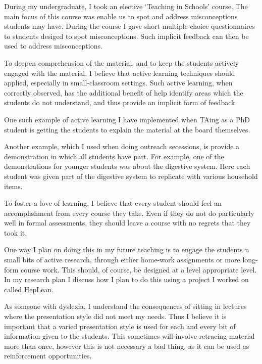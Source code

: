 \documentclass[12pt,letter]{article}
\newcounter{customtitle}
\begin{document}
 During my undergraduate, I took an elective `Teaching in Schools' course. The main focus of this course was enable us to spot and address misconceptions students may have.  During the course I gave short multiple-choice questionnaires to students desiged to spot misconceptions. Such implicit feedback can then be used to address misconceptions.
 
 To deepen comprehension of the material, and to keep the students actively   engaged with the material, I believe that active learning techniques should applied, especially in small-classroom
settings. Such active learning, when correctly observed, has the additional benefit of help identify areas which the students 
do not understand, and thus provide an implicit form of feedback.

One such example of active learning I have implemented when TAing as a PhD student is getting the students to explain the material at the board themselves. 

Another example, which I used when doing outreach secessions, is provide a demonstration in which all students have part. For example, one of the demonstrations for younger students was about the digestive system. Here each student was given part of the  digestive system to replicate with various household items.  

  
 To foster a love of learning, 
  I believe that every student should
  feel an accomplishment from every course they take. Even if they do not do particularly well in formal assessments, they should leave a course with no regrets that they took it. 
  
  One way I plan on doing this in my future teaching is to  engage the students n small bits of active research, through either 
home-work assignments or more long-form course work. This should, of course, 
be designed at a level appropriate level. In my research plan I discuss how I plan to do this using a project I worked on called HepLean. 

 
 As someone with dyslexia, I understand
 the consequences of sitting in lectures  where the presentation 
style did not meet my needs. Thus I believe it is important that a varied presentation 
style is used for each and every bit of information given to the students. 
This sometimes will involve retracing material more than once, however this 
is not necessary a bad thing, as it can be used as reinforcement opportunities. 
\end{document}
